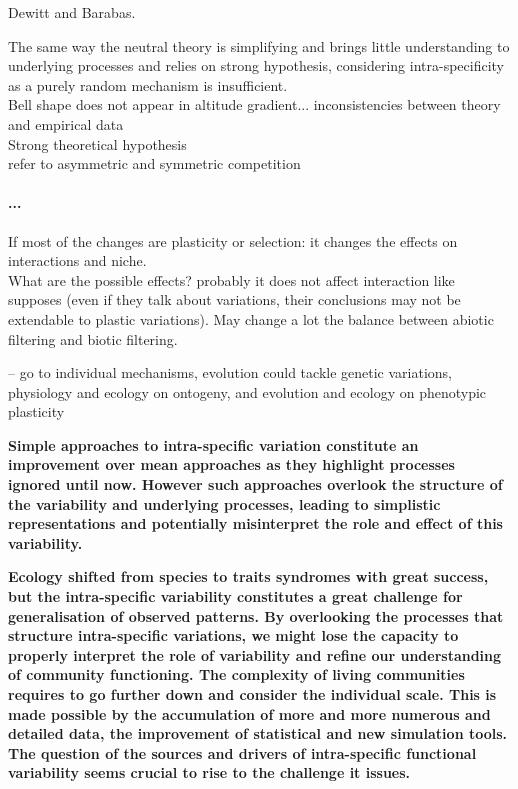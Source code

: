 {Dewitt and Barabas.

The same way the neutral theory is simplifying and brings little understanding to underlying processes and relies on strong hypothesis, considering intra-specificity as a purely random mechanism is insufficient.\\
Bell shape does not appear in altitude gradient... inconsistencies between theory and empirical data\\
Strong theoretical hypothesis\\
refer to asymmetric and symmetric competition\\

\paragraph{...}
If most of the changes are plasticity or selection: it changes the effects on interactions and niche.\\
What are the possible effects? probably it does not affect interaction like \parencite{hart_how_2016} supposes (even if they talk about variations, their conclusions may not be extendable to plastic variations). May change a lot the balance between abiotic filtering and biotic filtering. 

-- go to individual mechanisms, evolution could tackle genetic variations, physiology and ecology on ontogeny, and evolution and ecology on phenotypic plasticity


\textbf{Simple approaches to intra-specific variation constitute an improvement over mean approaches as they highlight processes ignored until now. However such approaches overlook the structure of the variability and underlying processes, leading to simplistic representations and potentially misinterpret the role and effect of this variability.}


\textbf{%
Ecology shifted from species to traits syndromes with great success, but the intra-specific variability constitutes a great challenge for generalisation of observed patterns. By overlooking the processes that structure intra-specific variations, we might lose the capacity to properly interpret the role of variability and refine our understanding of community functioning. The complexity of living communities requires to go further down and consider the individual scale. This is made possible by the accumulation of more and more numerous and detailed data, the improvement of statistical and new simulation tools. The question of the sources and drivers of intra-specific functional variability seems crucial to rise to the challenge it issues.}



}
